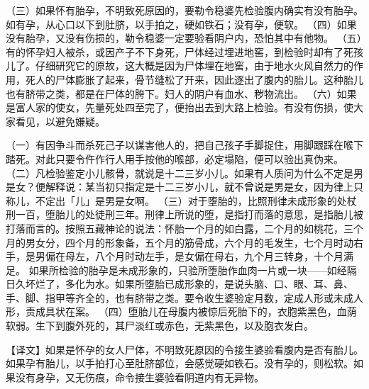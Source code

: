 \documentclass[12pt,UTF8]{ctexbook}
\begin{document}
（三）如果怀有胎孕，不明致死原因的，要勒令稳婆先检验腹内确实有没有胎孕。如有孕，从心口以下到肚脐，以手拍之，硬如铁石；没有孕，便软。
（四）如果没有胎孕，又没有伤损的，勒令稳婆一定要验看阴户内，恐怕其中有他物。
（五）有的怀孕妇人被杀，或因产子不下身死，尸体经过埋进地窖，到检验时却有了死孩儿了。仔细研究它的原故，这大概是因为尸体埋在地窖，由于地水火风自然力的作用，死人的尸体膨胀了起来，骨节缝松了开来，因此逐出了腹内的胎儿。这种胎儿也有脐带之类，都是在尸体的胯下。妇人的阴户有血水、秽物流出。
（六）如果是富人家的使女，先量死处四至完了，便抬出去到大路上检验。有没有伤损，使大家看见，以避免嫌疑。


（一）有因争斗而杀死己子以谋害他人的，把自己孩子手脚捉住，用脚跟踩在喉下踏死。对此只要令仵作行人用手按他的喉部，必定塌陷，便可以验出真伪来。
（二）凡检验鉴定小儿骸骨，就说是十二三岁小儿。如果有人质问为什么不定是男是女？便解释说：某当初只指定是十二三岁小儿，就不曾说是男是女，因为律上只称儿，不定出「儿」是男是女啊。
（三）对于堕胎的，比照刑律未成形象的处杖刑一百，堕胎儿的处徒刑三年。刑律上所说的堕，是指打而落的意思，是指胎儿被打落而言的。按照五藏神论的说法：怀胎一个月的如白露，二个月的如桃花，三个月的男女分，四个月的形象备，五个月的筋骨成，六个月的毛发生，七个月时动右手，是男偏在母左，八个月时动左手，是女偏在母右，九个月三转身，十个月满足。
如果所检验的胎孕是未成形象的，只验所堕胎作血肉一片或一块——如经隔日久坏烂了，多化为水。如果所堕胎已成形象的，是说头脑、口、眼、耳、鼻、手、脚、指甲等齐全的，也有脐带之类。要令收生婆验定月数，定成人形或未成人形，责成具状在案。
（四）堕胎儿在母腹内被惊后死胎下的，衣胞紫黑色，血荫软弱。生下到腹外死的，其尸淡红或赤色，无紫黑色，以及胞衣发白。


【译文】如果是怀孕的女人尸体，不明致死原因的令接生婆验看腹内是否有胎儿。如果孕有胎儿，以手拍打心至肚脐部位，会感觉硬如铁石。没有孕的，则松软。如果没有身孕，又无伤痕，命令接生婆验看阴道内有无异物。
\end{document}
